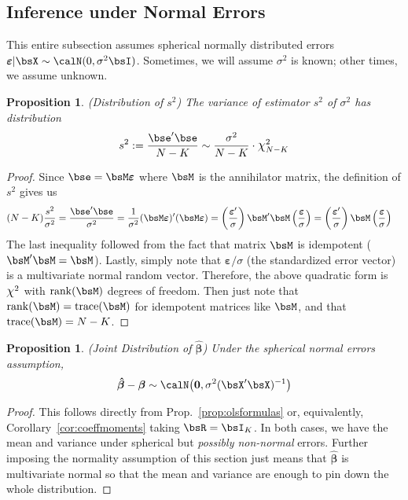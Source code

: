 \documentclass[12pt]{article}
\theoremstyle{plain}
\newtheorem{prop}[thm]{Proposition}
\theoremstyle{definition}
\theoremstyle{remark}
\newcommand*{\Chi}{\mbox{\large$\chi$}} %
\newcommand{\bsvarepsilon}{\boldsymbol{\varepsilon}}
\newcommand{\bsbeta}{\boldsymbol{\beta}}
\newcommand{\bshatbeta}{\boldsymbol{\hat{\beta}}}
\renewcommand{\bso}{\boldsymbol{0}}
\newcommand{\rank}{\operatorname{rank}}
\newcommand{\trace}{\operatorname{trace}}
\begin{document}
\clearpage
\subsection{Inference under Normal Errors}

This entire subsection assumes spherical normally distributed errors
$\bsvarepsilon|\bsX\sim \calN(0,\sigma^2\bsI)$. Sometimes, we will
assume $\sigma^2$ is known; other times, we assume unknown.

\begin{prop}\emph{(Distribution of $s^2$)}
\label{prop:dists2}
The variance of estimator $s^2$ of $\sigma^2$ has distribution
\begin{align}
  s^2
  := \frac{\bse'\bse}{N-K}
  \sim
  \frac{\sigma^2}{N-K}
  \cdot
  \Chi^2_{N-K}
  \label{s2dist}
\end{align}
\end{prop}
\begin{proof}
Since $\bse=\bsM\bsvarepsilon$ where $\bsM$ is the annihilator matrix,
the definition of $s^2$ gives us
\begin{align*}
  (N-K) \frac{s^2}{\sigma^2}
  &= \frac{\bse' \bse}{\sigma^2}
  = \frac{1}{\sigma^2}(\bsM\bsvarepsilon)' (\bsM\bsvarepsilon)
  = \left(\frac{\bsvarepsilon'}{\sigma}\right)\bsM'
    \bsM\left(\frac{\bsvarepsilon}{\sigma}\right)
  = \left(\frac{\bsvarepsilon'}{\sigma}\right)
    \bsM\left(\frac{\bsvarepsilon}{\sigma}\right)
\end{align*}
The last inequality followed from the fact that matrix $\bsM$ is
idempotent ($\bsM'\bsM=\bsM$).
Lastly, simply note that $\bsvarepsilon/\sigma$ (the standardized error
vector) is a multivariate normal random vector. Therefore, the above
quadratic form is $\Chi^2$ with $\rank(\bsM)$ degrees of freedom. Then
just note that $\rank(\bsM)=\trace(\bsM)$ for idempotent matrices like
$\bsM$, and that $\trace(\bsM)=N-K$.
\end{proof}

\begin{prop}\emph{(Joint Distribution of $\bshatbeta$)}
\label{prop:olsjointdist}
Under the spherical normal errors assumption,
\begin{align*}
  \bshatbeta - \bsbeta
  \sim
  \calN\big(\bso,\sigma^2 (\bsX'\bsX)^{-1}\big)
\end{align*}
\end{prop}
\begin{proof}
This follows directly from Prop.~\ref{prop:olsformulas} or,
equivalently, Corollary~\ref{cor:coeffmoments} taking $\bsR=\bsI_K$.
In both cases, we have the mean and variance under spherical but
\emph{possibly non-normal} errors. Further imposing the normality
assumption of this section just means that $\bshatbeta$ is multivariate
normal so that the mean and variance are enough to pin down the whole
distribution.
\end{proof}
\end{document}
